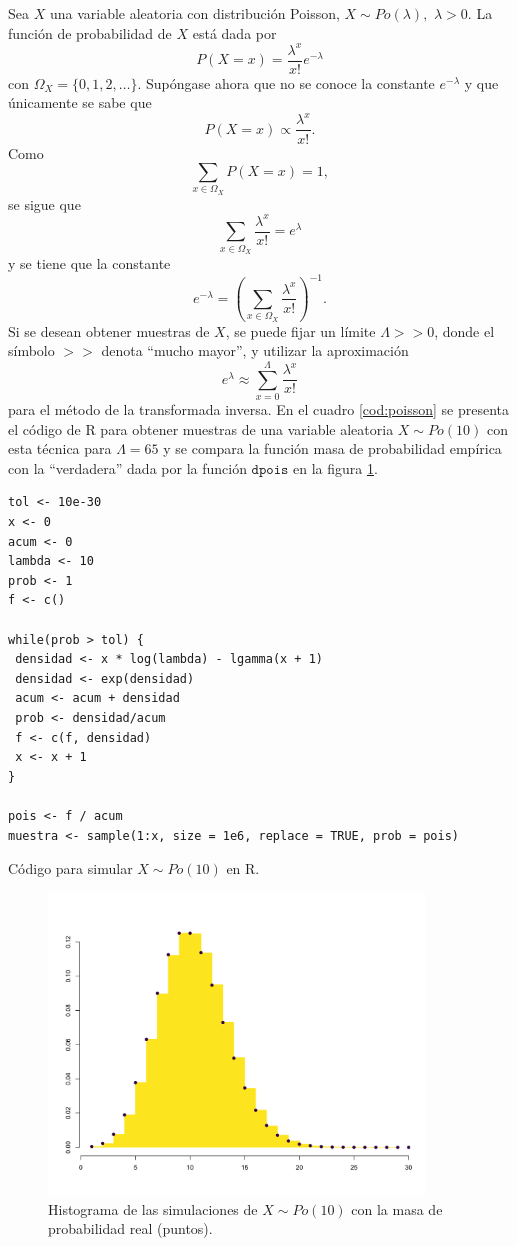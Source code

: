 \documentclass[11pt,a4paper]{article}
\begin{document}
Sea $X$ una variable aleatoria con distribución Poisson, $X \sim Po(\lambda),$ $\lambda > 0$. La función de probabilidad de $X$ está dada por
$$P(X = x) = \frac{\lambda ^ x}{x!}e^{-\lambda}$$ con $\Omega_X = \lbrace 0, 1, 2, \dots \rbrace$. Supóngase ahora que no se conoce la constante $e^{-\lambda}$ y que únicamente se sabe que $$P(X = x) \propto  \frac{\lambda ^ x}{x!}.$$ Como $$\sum_{x \in \Omega_X} P(X = x) = 1,$$ se sigue que $$\sum_{x \in \Omega_X} \frac{\lambda ^ x}{x!} = e^{\lambda}$$ y se tiene que la constante $$e^{-\lambda} = \left( \sum_{x \in \Omega_X} \frac{\lambda ^ x}{x!}\right) ^{-1}.$$ Si se desean obtener muestras de $X$, se puede fijar un límite $\Lambda >> 0$, donde el símbolo $>>$ denota ``mucho mayor'', y utilizar la aproximación $$ e^{\lambda} \approx \sum_{x = 0}^{\Lambda} \frac{\lambda ^ x}{x!}$$ para el método de la transformada inversa. En el cuadro \ref{cod:poisson} se presenta el código de R para obtener muestras de una variable aleatoria $X \sim Po(10)$ con esta técnica para $\Lambda = 65$ y se compara la función masa de probabilidad empírica con la ``verdadera'' dada por la función $\mathtt{dpois}$ en la figura \ref{fig:poisson}.

\begin{table}[htb]
\begin{lstlisting}
tol <- 10e-30
x <- 0
acum <- 0
lambda <- 10
prob <- 1
f <- c()

while(prob > tol) {
 densidad <- x * log(lambda) - lgamma(x + 1)
 densidad <- exp(densidad)
 acum <- acum + densidad
 prob <- densidad/acum
 f <- c(f, densidad)
 x <- x + 1
}

pois <- f / acum
muestra <- sample(1:x, size = 1e6, replace = TRUE, prob = pois)
\end{lstlisting}
\caption{Código para simular $X \sim Po(10)$ en R. }
\label{cod:poisson}
\end{table}

\begin{figure}[htb]
\centering\includegraphics[width=10cm]{poisson.png}
\caption{Histograma de las simulaciones de $X \sim Po(10)$ con la masa de probabilidad real (puntos).}
\label{fig:poisson}
\end{figure}
\end{document}
